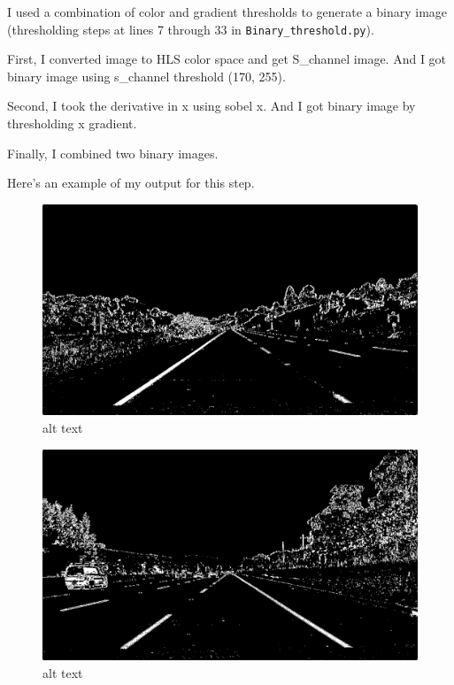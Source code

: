 \documentclass[11pt]{article}
\makeatletter
\def\maxwidth{\ifdim\Gin@nat@width>\linewidth\linewidth
    \else\Gin@nat@width\fi}
\let\Oldincludegraphics\includegraphics
\renewcommand{\includegraphics}[1]{\Oldincludegraphics[width=.8\maxwidth]{#1}}
\makeatother
\begin{document}
I used a combination of color and gradient thresholds to generate a
binary image (thresholding steps at lines 7 through 33 in
\texttt{Binary\_threshold.py}).

First, I converted image to HLS color space and get S\_channel image.
And I got binary image using s\_channel threshold (170, 255).

Second, I took the derivative in x using sobel x. And I got binary image
by thresholding x gradient.

Finally, I combined two binary images.

Here's an example of my output for this step.

\begin{figure}
\centering
\includegraphics{./output_images/straight_lines1_binary_thresholded.jpg}
\caption{alt text}
\end{figure}

\begin{figure}
\centering
\includegraphics{./output_images/straight_lines2_binary_thresholded.jpg}
\caption{alt text}
\end{figure}
\end{document}
